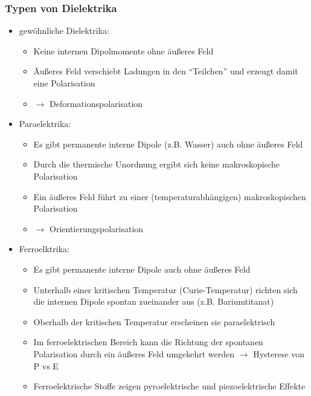 \begin{frame}
\frametitle{Typen von Dielektrika}
\begin{itemize}[<+->]
\item \alert{gewöhnliche Dielektrika:}
  \begin{itemize}[<+->]
  \item Keine internen Dipolmomente ohne äußeres Feld
  \item Äußeres Feld verschiebt Ladungen in den \enquote{Teilchen} und erzeugt damit eine Polarisation
  \item $\to$ \alert{Deformationspolarisation}
  \end{itemize}
\item \alert{Paraelektrika:}
    \begin{itemize}[<+->]
    \item Es gibt permanente interne Dipole (z.B. Wasser) auch ohne äußeres Feld
    \item Durch die thermische Unordnung ergibt sich keine makroskopische Polarisation
    \item Ein äußeres Feld führt zu einer (temperaturabhängigen) makroskopischen Polarisation
      \item $\to$ \alert{Orientierungspolarisation}
      \end{itemize}
      \item \alert{Ferroelktrika:}
    \begin{itemize}[<+->]
    \item Es gibt permanente interne Dipole auch ohne äußeres Feld
    \item Unterhalb einer kritischen Temperatur (Curie-Temperatur) richten sich die internen Dipole \alert{spontan} zueinander aus (z.B. Bariumtitanat)
    \item Oberhalb der kritischen Temperatur erscheinen sie paraelektrisch
    \item Im ferroelektrischen Bereich kann die Richtung der spontanen Polarisation durch ein äußeres Feld umgekehrt werden $\to$ \alert{Hysterese} von P vs E
      \item Ferroelektrische Stoffe zeigen \alert{pyroelektrische} und \alert{piezoelektrische} Effekte   
      \end{itemize}
\end{itemize}
\end{frame}


